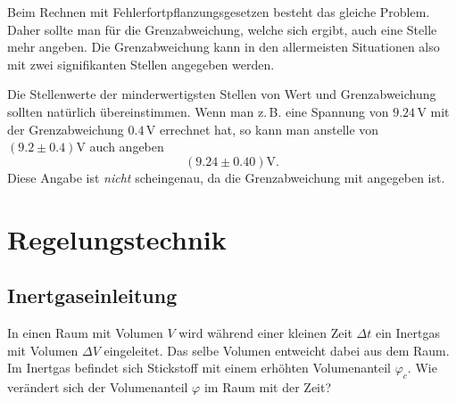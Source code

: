 \documentclass[a4paper,11pt,fleqn,twocolumn,twoside,dvipdfmx]{scrartcl}
\numberwithin{equation}{section}
\begin{document}
Beim Rechnen mit Fehlerfortpflanzungsgesetzen besteht das gleiche
Problem. Daher sollte man für die Grenzabweichung, welche sich ergibt,
auch eine Stelle mehr angeben. Die Grenzabweichung kann in den
allermeisten Situationen also mit zwei signifikanten Stellen angegeben
werden.

Die Stellenwerte der minderwertigsten Stellen von Wert und
Grenzabweichung sollten natürlich übereinstimmen.
Wenn man z.\,B. eine Spannung von $9.24\,\mathrm V$ mit der
Grenzabweichung $0.4\,\mathrm V$ errechnet hat, so kann man
anstelle von $(9.2\pm 0.4)\mathrm V$ auch angeben
\begin{equation}
(9.24\pm 0.40)\mathrm V.
\end{equation}
Diese Angabe ist \textit{nicht} scheingenau, da die Grenzabweichung
mit angegeben ist.


\section{Regelungstechnik}
\subsection{Inertgaseinleitung}
In einen Raum mit Volumen $V$ wird während einer kleinen
Zeit $\Delta t$ ein Inertgas mit Volumen $\Delta V$ eingeleitet.
Das selbe Volumen entweicht dabei aus dem Raum. Im Inertgas
befindet sich Stickstoff mit einem erhöhten Volumenanteil $\varphi_c$.
Wie verändert sich der Volumenanteil $\varphi$ im Raum mit der Zeit?
\end{document}
